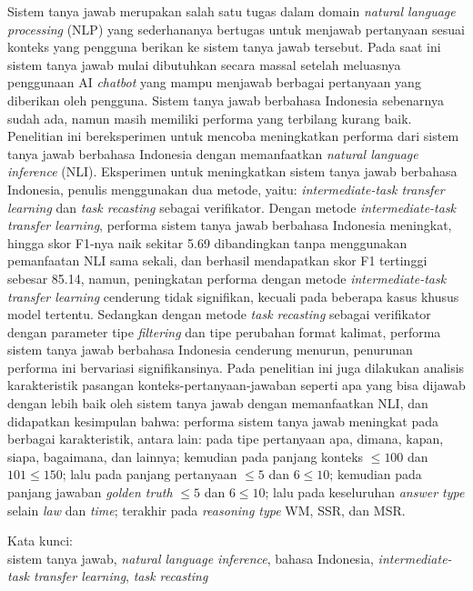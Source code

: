 \noindent Sistem tanya jawab merupakan salah satu tugas dalam domain \emph{natural language processing} (NLP) yang sederhananya bertugas untuk menjawab pertanyaan sesuai konteks yang pengguna berikan ke sistem tanya jawab tersebut. Pada saat ini sistem tanya jawab mulai dibutuhkan secara massal setelah meluasnya penggunaan AI \emph{chatbot} yang mampu menjawab berbagai pertanyaan yang diberikan oleh pengguna. Sistem tanya jawab berbahasa Indonesia sebenarnya sudah ada, namun masih memiliki performa yang terbilang kurang baik. Penelitian ini bereksperimen untuk mencoba meningkatkan performa dari sistem tanya jawab berbahasa Indonesia dengan memanfaatkan \emph{natural language inference} (NLI). Eksperimen untuk meningkatkan sistem tanya jawab berbahasa Indonesia, penulis menggunakan dua metode, yaitu: \emph{intermediate-task transfer learning} dan \emph{task recasting} sebagai verifikator. Dengan metode \emph{intermediate-task transfer learning}, performa sistem tanya jawab berbahasa Indonesia meningkat, hingga skor F1-nya naik sekitar 5.69 dibandingkan tanpa menggunakan pemanfaatan NLI sama sekali, dan berhasil mendapatkan skor F1 tertinggi sebesar 85.14, namun, peningkatan performa dengan metode \emph{intermediate-task transfer learning} cenderung tidak signifikan, kecuali pada beberapa kasus khusus model tertentu. Sedangkan dengan metode \emph{task recasting} sebagai verifikator dengan parameter tipe \emph{filtering} dan tipe perubahan format kalimat, performa sistem tanya jawab berbahasa Indonesia cenderung menurun, penurunan performa ini bervariasi signifikansinya. Pada penelitian ini juga dilakukan analisis karakteristik pasangan konteks-pertanyaan-jawaban seperti apa yang bisa dijawab dengan lebih baik oleh sistem tanya jawab dengan memanfaatkan NLI, dan didapatkan kesimpulan bahwa: performa sistem tanya jawab meningkat pada berbagai karakteristik, antara lain: pada tipe pertanyaan apa, dimana, kapan, siapa, bagaimana, dan lainnya; kemudian pada panjang konteks $\leq100$ dan $101\leq150$; lalu pada panjang pertanyaan $\leq5$ dan $6\leq10$; kemudian pada panjang jawaban \emph{golden truth} $\leq5$ dan $6\leq10$; lalu pada keseluruhan \emph{answer type} selain \emph{law} dan \emph{time}; terakhir pada \emph{reasoning type} WM, SSR, dan MSR. \\

\vspace*{0.2cm}

\noindent Kata kunci: \\ sistem tanya jawab, \emph{natural language inference}, bahasa Indonesia, \emph{intermediate-task transfer learning}, \emph{task recasting} \\

\newpage
